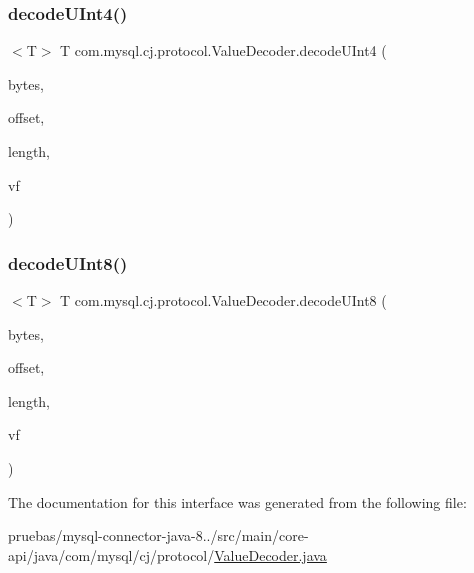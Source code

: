 \mbox{\label{interfacecom_1_1mysql_1_1cj_1_1protocol_1_1_value_decoder_a7f79158fa5e70cfb237a32a43a79b29a}} 
\subsubsection{\texorpdfstring{decode\+U\+Int4()}{decodeUInt4()}}
{\footnotesize\ttfamily $<$T$>$ T com.\+mysql.\+cj.\+protocol.\+Value\+Decoder.\+decode\+U\+Int4 (\begin{DoxyParamCaption}\item[{byte \mbox{[}$\,$\mbox{]}}]{bytes,  }\item[{int}]{offset,  }\item[{int}]{length,  }\item[{\mbox{\hyperlink{interfacecom_1_1mysql_1_1cj_1_1result_1_1_value_factory}{Value\+Factory}}$<$ T $>$}]{vf }\end{DoxyParamCaption})}

\mbox{\label{interfacecom_1_1mysql_1_1cj_1_1protocol_1_1_value_decoder_aa27f53c4c6f0933ac3a74a90c3071297}} 
\subsubsection{\texorpdfstring{decode\+U\+Int8()}{decodeUInt8()}}
{\footnotesize\ttfamily $<$T$>$ T com.\+mysql.\+cj.\+protocol.\+Value\+Decoder.\+decode\+U\+Int8 (\begin{DoxyParamCaption}\item[{byte \mbox{[}$\,$\mbox{]}}]{bytes,  }\item[{int}]{offset,  }\item[{int}]{length,  }\item[{\mbox{\hyperlink{interfacecom_1_1mysql_1_1cj_1_1result_1_1_value_factory}{Value\+Factory}}$<$ T $>$}]{vf }\end{DoxyParamCaption})}



The documentation for this interface was generated from the following file\+:\begin{DoxyCompactItemize}
\item 
pruebas/mysql-\/connector-\/java-\/8../src/main/core-\/api/java/com/mysql/cj/protocol/\mbox{\hyperlink{_value_decoder_8java}{Value\+Decoder.\+java}}\end{DoxyCompactItemize}
